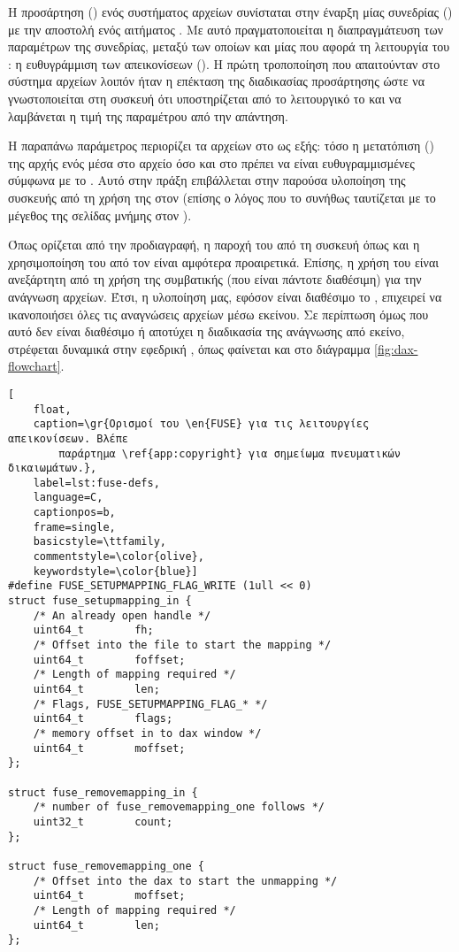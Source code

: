 Η προσάρτηση () ενός \viofs{} συστήματος αρχείων συνίσταται στην
έναρξη μίας  συνεδρίας () με την αποστολή ενός
 αιτήματος \cite{virtio}. Με αυτό πραγματοποιείται η
διαπραγμάτευση των παραμέτρων της συνεδρίας, μεταξύ των οποίων και μίας που
αφορά τη λειτουργία του : η ευθυγράμμιση των απεικονίσεων
(). Η πρώτη τροποποίηση που απαιτούνταν στο σύστημα αρχείων
λοιπόν ήταν η επέκταση της διαδικασίας προσάρτησης ώστε να γνωστοποιείται στη
συσκευή ότι υποστηρίζεται από το λειτουργικό το  και να
λαμβάνεται η τιμή της παραμέτρου από την απάντηση.

Η παραπάνω παράμετρος περιορίζει τα  αρχείων στο  ως
εξής: τόσο η μετατόπιση () της αρχής ενός  μέσα στο
αρχείο όσο και στο  πρέπει να είναι ευθυγραμμισμένες σύμφωνα με
το . Αυτό στην πράξη επιβάλλεται στην παρούσα υλοποίηση της
\viofs{} συσκευής από τη χρήση της \texttt{} \cite{man:mmap} στον
\host{} (επίσης ο λόγος που το  συνήθως ταυτίζεται με το
μέγεθος της σελίδας μνήμης στον \host{}).

Όπως ορίζεται από την προδιαγραφή, η παροχή του  από τη συσκευή
όπως και η χρησιμοποίηση του από τον \guest{} είναι αμφότερα προαιρετικά.
Επίσης, η χρήση του  είναι ανεξάρτητη από τη χρήση της συμβατικής
 (που είναι πάντοτε διαθέσιμη) για την ανάγνωση αρχείων. Έτσι, η
υλοποίηση μας, εφόσον είναι διαθέσιμο το , επιχειρεί να
ικανοποιήσει όλες τις αναγνώσεις αρχείων μέσω εκείνου. Σε περίπτωση όμως που
αυτό δεν είναι διαθέσιμο ή αποτύχει η διαδικασία της ανάγνωσης από εκείνο,
στρέφεται δυναμικά στην εφεδρική , όπως φαίνεται και στο
διάγραμμα \ref{fig:dax-flowchart}.

\begin{otherlanguage}{english}
\begin{lstlisting}[
    float,
    caption=\gr{Ορισμοί του \en{FUSE} για τις λειτουργίες απεικονίσεων. Βλέπε
        παράρτημα \ref{app:copyright} για σημείωμα πνευματικών δικαιωμάτων.},
    label=lst:fuse-defs,
    language=C,
    captionpos=b,
    frame=single,
    basicstyle=\ttfamily,
    commentstyle=\color{olive},
    keywordstyle=\color{blue}]
#define FUSE_SETUPMAPPING_FLAG_WRITE (1ull << 0)
struct fuse_setupmapping_in {
    /* An already open handle */
    uint64_t        fh;
    /* Offset into the file to start the mapping */
    uint64_t        foffset;
    /* Length of mapping required */
    uint64_t        len;
    /* Flags, FUSE_SETUPMAPPING_FLAG_* */
    uint64_t        flags;
    /* memory offset in to dax window */
    uint64_t        moffset;
};

struct fuse_removemapping_in {
    /* number of fuse_removemapping_one follows */
    uint32_t        count;
};

struct fuse_removemapping_one {
    /* Offset into the dax to start the unmapping */
    uint64_t        moffset;
    /* Length of mapping required */
    uint64_t        len;
};
\end{lstlisting}
\end{otherlanguage}

